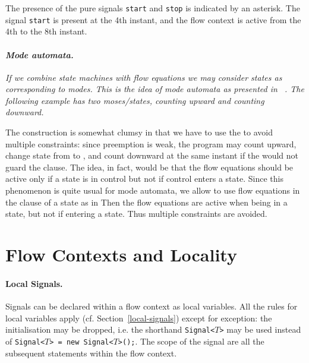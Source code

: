 The presence of the pure signals \texttt{start} and
\texttt{stop} is indicated by an asterisk. The signal \texttt{start} is present at the 4th instant,
and the flow context is active from the 4th to the 8th instant.  

\paragraph{\textit{Mode automata.}}\label{mode-automata} 
{\em If we combine state machines with flow equations we may consider states as corresponding to modes. This is the idea of \emph{mode automata} as 
presented in ~\cite{Maranchini}. The following example has two moses/states, counting upward and counting downward.
% 
%

The construction is somewhat clumsy in that we have to use the 
 to avoid multiple constraints: since preemption is weak, 
the program may count upward, change state from  to 
, and count downward at the same instant if the  would not guard the  clause. The idea, in fact, 
would be that the flow equations should be active only if a state is 
in control but not if control enters a state. Since this phenomenon 
is quite usual for mode automata, we allow to use flow equations in the 
 clause of a state as in 
% 
%
Then the flow equations are active when being in a state,
 but not if entering a state. Thus multiple constraints are avoided.
}

\section{Flow Contexts and Locality}

\paragraph{Local Signals.}
Signals can be declared within a flow context as local variables. All the rules for local variables apply (cf. Section~\ref{local-signals}) except for
exception: the initialisation
may be dropped, i.e. the shorthand \texttt{Signal<$T$>} may be used instead of \texttt{Signal<$T$> = new Signal<$T$>();}.
The scope of the signal are all the subsequent statements within the flow context.

